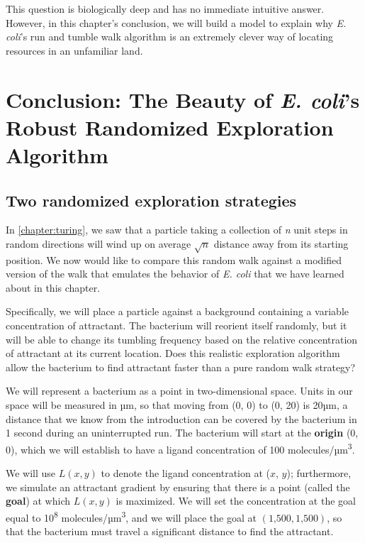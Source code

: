 This question is biologically deep and has no immediate intuitive answer. However, in this chapter's conclusion, we will build a model to explain why \textit{E. coli}'s run and tumble walk algorithm is an extremely clever way of locating resources in an unfamiliar land.\\


\FloatBarrier
{}

\section{Conclusion: The Beauty of \textit{E. coli}'s Robust Randomized Exploration Algorithm}
\label{sec:conclusion}

\subsection{Two randomized exploration strategies}

In \autoref{chapter:turing}, we saw that a particle taking a collection of \textit{n} unit steps in random directions will wind up on average $\sqrt{n}$ distance away from its starting position. We now would like to compare this random walk against a modified version of the walk that emulates the behavior of \textit{E. coli} that we have learned about in this chapter.

Specifically, we will place a particle against a background containing a variable concentration of attractant. The bacterium will reorient itself randomly, but it will be able to change its tumbling frequency based on the relative concentration of attractant at its current location. Does this realistic exploration algorithm allow the bacterium to find attractant faster than a pure random walk strategy?

We will represent a bacterium as a point in two-dimensional space. Units in our space will be measured in µm, so that moving from (0, 0) to (0, 20) is 20µm, a distance that we know from the introduction can be covered by the bacterium in 1 second during an uninterrupted run. The bacterium will start at the \textbf{origin} (0, 0), which we will establish to have a ligand concentration of 100 molecules/µm\textsuperscript{3}.

We will use $L(x,y)$ to denote the ligand concentration at ($x$, $y$); furthermore, we simulate an attractant gradient by ensuring that there is a point (called the \textbf{goal}) at which $L(x,y)$ is maximized. We will set the concentration at the goal equal to 10\textsuperscript{8} molecules/µm\textsuperscript{3}, and we will place the goal at $(\text{1,500}, \text{1,500})$, so that the bacterium must travel a significant distance to find the attractant.

